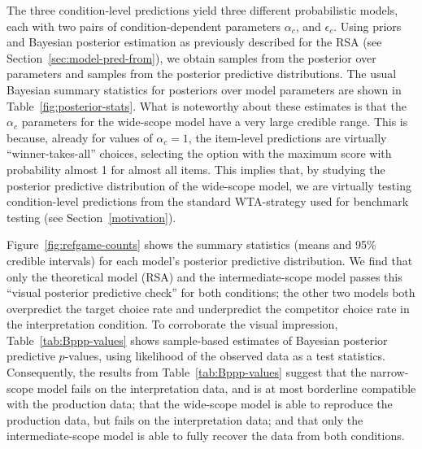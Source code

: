 \documentclass[fleqn]{article}
\begin{document}
The three condition-level predictions yield three different probabilistic models, each with two pairs of condition-dependent parameters $\alpha_{c}$, and $\epsilon_{c}$.
Using priors and Bayesian posterior estimation as previously described for the RSA (see Section~\ref{sec:model-pred-from}), we obtain samples from the posterior over parameters and samples from the posterior predictive distributions.
The usual Bayesian summary statistics for posteriors over model parameters are shown in Table~\ref{fig:posterior-stats}.
What is noteworthy about these estimates is that the $\alpha_{c}$ parameters for the wide-scope model have a very large credible range.
This is because, already for values of $\alpha_{c} = 1$, the item-level predictions are virtually ``winner-takes-all'' choices, selecting the option with the maximum score with probability almost 1 for almost all items.
This implies that, by studying the posterior predictive distribution of the wide-scope model, we are virtually testing condition-level predictions from the standard WTA-strategy used for benchmark testing (see Section~\ref{motivation}).

Figure~\ref{fig:refgame-counts} shows the summary statistics (means and 95\% credible intervals) for each model's posterior predictive distribution.
We find that only the theoretical model (RSA) and the intermediate-scope model passes this ``visual posterior predictive check'' for both conditions; the other two models both overpredict the target choice rate and underpredict the competitor choice rate in the interpretation condition.
To corroborate the visual impression, Table~\ref{tab:Bppp-values} shows sample-based estimates of Bayesian posterior predictive $p$-values, using likelihood of the observed data as a test statistics.
Consequently, the results from Table~\ref{tab:Bppp-values} suggest that the narrow-scope model fails on the interpretation data, and is at most borderline compatible with the production data; that the wide-scope model is able to reproduce the production data, but fails on the interpretation data; and that only the intermediate-scope model is able to fully recover the data from both conditions.
\end{document}
